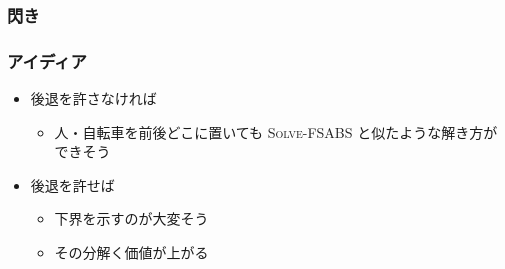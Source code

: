 \documentclass[dvipdfmx,12pt]{beamer}
\begin{document}
\begin{frame}
  \frametitle{閃き}
\end{frame}

\begin{frame}
  \frametitle{アイディア}
  \begin{itemize}
  \item<2-> 後退を許さなければ
    \begin{itemize}
    \item<3-> 人・自転車を前後どこに置いても \textsc{Solve-FSABS} と似たような解き方ができそう
    \end{itemize}
    \vspace{10pt}
  \item<4-> 後退を許せば
    \begin{itemize}
    \item<5-> 下界を示すのが大変そう
    \item<6-> その分解く価値が上がる
    \end{itemize}
  \end{itemize}
\end{frame}

\begin{frame}
\end{frame}
\end{document}
